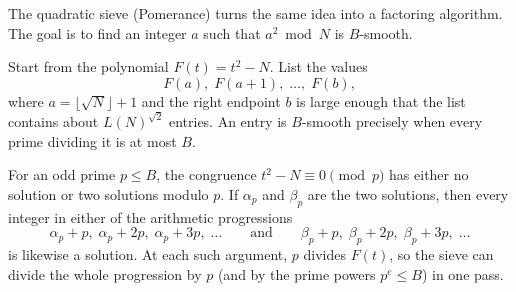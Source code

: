 The quadratic sieve (Pomerance) turns the same idea into a factoring
algorithm. The goal is to find an integer \(a\) such that \(a^{2}\bmod N\)
is \(B\)-smooth.

Start from the polynomial \(F(t)=t^{2}-N\). List the values
\[
    F(a),\; F(a+1),\; \ldots,\; F(b),
\]
where \(a=\lfloor\sqrt{N}\rfloor+1\) and the right endpoint \(b\) is large
enough that the list contains about \(L(N)^{\sqrt{2}}\) entries. An entry
is \(B\)-smooth precisely when every prime dividing it is at most \(B\).

For an odd prime \(p\le B\), the congruence \(t^{2}-N\equiv 0\pmod{p}\)
has either no solution or two solutions modulo \(p\). If \(\alpha_{p}\) and
\(\beta_{p}\) are the two solutions, then every integer in either of the
arithmetic progressions
\[
    \alpha_{p}+p,\;\alpha_{p}+2p,\;\alpha_{p}+3p,\;\ldots
    \qquad\text{and}\qquad
    \beta_{p}+p,\;\beta_{p}+2p,\;\beta_{p}+3p,\;\ldots
\]
is likewise a solution. At each such argument, \(p\) divides \(F(t)\), so
the sieve can divide the whole progression by \(p\) (and by the prime
powers \(p^{e}\le B\)) in one pass.


